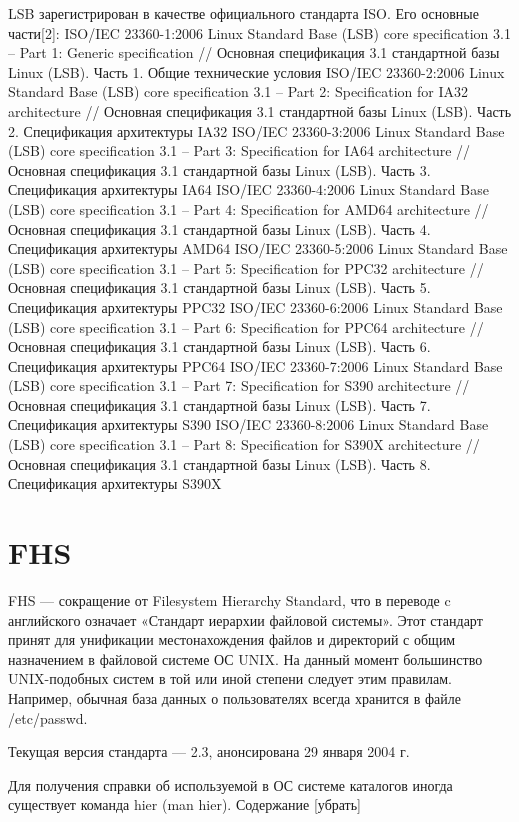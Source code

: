 LSB зарегистрирован в качестве официального стандарта ISO. Его основные части[2]:
ISO/IEC 23360-1:2006 	Linux Standard Base (LSB) core specification 3.1 -- Part 1: Generic specification // Основная спецификация 3.1 стандартной базы Linux (LSB). Часть 1. Общие технические условия
ISO/IEC 23360-2:2006 	Linux Standard Base (LSB) core specification 3.1 -- Part 2: Specification for IA32 architecture // Основная спецификация 3.1 стандартной базы Linux (LSB). Часть 2. Спецификация архитектуры IA32
ISO/IEC 23360-3:2006 	Linux Standard Base (LSB) core specification 3.1 -- Part 3: Specification for IA64 architecture // Основная спецификация 3.1 стандартной базы Linux (LSB). Часть 3. Спецификация архитектуры IA64
ISO/IEC 23360-4:2006 	Linux Standard Base (LSB) core specification 3.1 -- Part 4: Specification for AMD64 architecture // Основная спецификация 3.1 стандартной базы Linux (LSB). Часть 4. Спецификация архитектуры AMD64
ISO/IEC 23360-5:2006 	Linux Standard Base (LSB) core specification 3.1 -- Part 5: Specification for PPC32 architecture // Основная спецификация 3.1 стандартной базы Linux (LSB). Часть 5. Спецификация архитектуры PPC32
ISO/IEC 23360-6:2006 	Linux Standard Base (LSB) core specification 3.1 -- Part 6: Specification for PPC64 architecture // Основная спецификация 3.1 стандартной базы Linux (LSB). Часть 6. Спецификация архитектуры PPC64
ISO/IEC 23360-7:2006 	Linux Standard Base (LSB) core specification 3.1 -- Part 7: Specification for S390 architecture // Основная спецификация 3.1 стандартной базы Linux (LSB). Часть 7. Спецификация архитектуры S390
ISO/IEC 23360-8:2006 	Linux Standard Base (LSB) core specification 3.1 -- Part 8: Specification for S390X architecture // Основная спецификация 3.1 стандартной базы Linux (LSB). Часть 8. Спецификация архитектуры S390X
\section {FHS}
FHS — сокращение от Filesystem Hierarchy Standard, что в переводе c английского означает «Стандарт иерархии файловой системы». Этот стандарт принят для унификации местонахождения файлов и директорий с общим назначением в файловой системе ОС UNIX. На данный момент большинство UNIX-подобных систем в той или иной степени следует этим правилам. Например, обычная база данных о пользователях всегда хранится в файле /etc/passwd.

Текущая версия стандарта — 2.3, анонсирована 29 января 2004 г.

Для получения справки об используемой в ОС системе каталогов иногда существует команда hier (man hier).
Содержание
[убрать]

